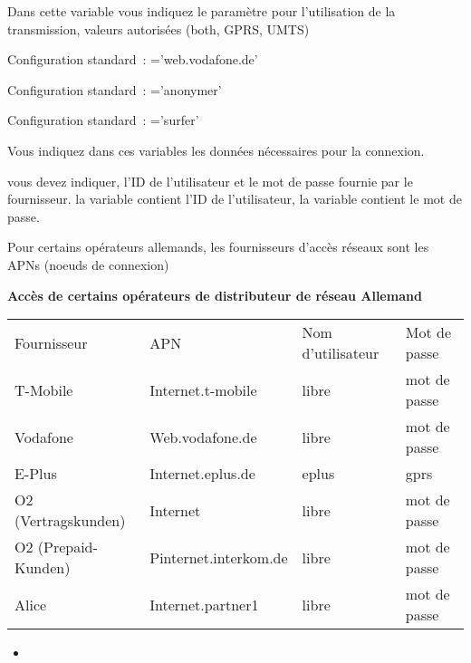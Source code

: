 \begin{description}
  Dans cette variable vous indiquez le paramètre pour l'utilisation de la
  transmission, valeurs autorisées (both, GPRS, UMTS)


  Configuration standard~: ='web.vodafone.de'


  Configuration standard~: ='anonymer'


  Configuration standard~: ='surfer'

  Vous indiquez dans ces variables les données nécessaires pour la connexion.

  vous devez indiquer, l'ID de l'utilisateur et le mot de passe fournie par le
  fournisseur. la variable  contient l'ID de l'utilisateur, la
  variable  contient le mot de passe.

  Pour certains opérateurs allemands, les fournisseurs d'accès réseaux sont les
  APNs (noeuds de connexion)

  \begin{table}
  \textbf{Accès de certains opérateurs de distributeur de réseau Allemand }

  \vspace{1ex}
  \begin{tabular}{llll}
  Fournisseur         &APN                   &Nom d'utilisateur &Mot de passe \\
  T-Mobile            &Internet.t-mobile     &libre     &mot de passe \\
  Vodafone            &Web.vodafone.de       &libre     &mot de passe \\
  E-Plus              &Internet.eplus.de     &eplus     &gprs \\
  O2 (Vertragskunden) &Internet              &libre     &mot de passe \\
  O2 (Prepaid-Kunden) &Pinternet.interkom.de &libre     &mot de passe \\
  Alice               &Internet.partner1     &libre     &mot de passe \\
  \end{tabular}
  \end{table}

  \begin{itemize}
  \item {}
  \end{itemize}


\end{description}
